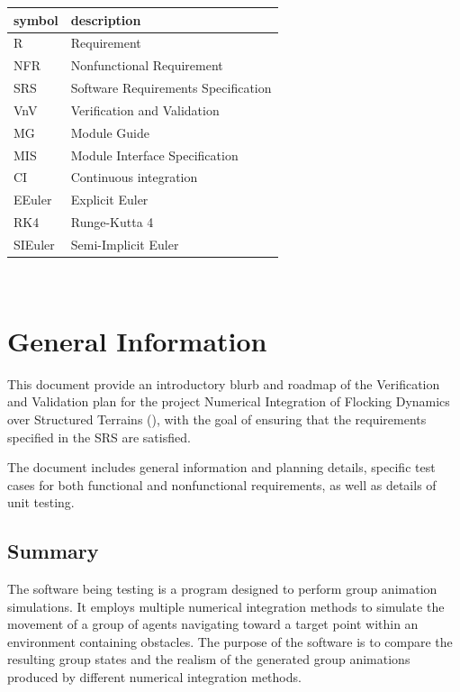 \documentclass[12pt, titlepage]{article}
\begin{document}
\renewcommand{\arraystretch}{1.2}
\begin{tabular}{l l} 
  \toprule		
  \textbf{symbol} & \textbf{description}\\
  \midrule 
  R & Requirement \\
  NFR & Nonfunctional Requirement \\
  SRS & Software Requirements Specification\\
  VnV & Verification and Validation \\
  MG & Module Guide \\
  MIS & Module Interface Specification \\
  CI & Continuous integration \\
  EEuler & Explicit Euler\\
  RK4 & Runge-Kutta 4\\
  SIEuler & Semi-Implicit Euler\\
  \bottomrule
\end{tabular}\\

\newpage


\section{General Information}

This document provide an introductory blurb and roadmap of the Verification and 
Validation plan for the project Numerical Integration of Flocking Dynamics over 
Structured Terrains (\progname{}), with the goal of ensuring that the 
requirements specified in the SRS are satisfied.

The document includes general information and planning details, specific test 
cases for both functional and nonfunctional requirements, as well as details of 
unit testing.

\subsection{Summary}

The software being testing is a program designed to perform group animation 
simulations. It employs multiple numerical integration methods to simulate the 
movement of a group of agents navigating toward a target point within an 
environment containing obstacles. The purpose of the software is to compare the 
resulting group states and the realism of the generated group animations 
produced by different numerical integration methods.
\end{document}

